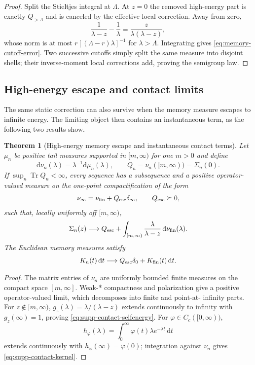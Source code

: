 \documentclass[11pt]{article}
\newtheorem{theorem}{Theorem}[section]
\theoremstyle{definition}
\theoremstyle{remark}
\theoremstyle{definition}
\theoremstyle{remark}
\newcommand{\dd}{\mathrm d}
\newcommand{\Tr}{\operatorname{Tr}}
\begin{document}
\begin{proof}
Split the Stieltjes integral at $\Lambda$.  At $z=0$ the removed high-energy part is
exactly $Q_{>\Lambda}$ and is canceled by the effective local correction.  Away from zero,
\[
\frac1{\lambda-z}-\frac1\lambda
=\frac z{\lambda(\lambda-z)},
\]
whose norm is at most
$r[(\Lambda-r)\lambda]^{-1}$ for $\lambda>\Lambda$.  Integrating gives
\eqref{eq:memory-cutoff-error}.  Two successive cutoffs simply split the same
measure into disjoint shells; their inverse-moment local corrections add, proving the
semigroup law.
\end{proof}

\subsection{High-energy escape and contact limits}

The same static correction can also survive when the memory measure escapes
to infinite energy.  The limiting object then contains an instantaneous
term, as the following two results show.

\begin{theorem}[High-energy memory escape and instantaneous contact terms]
\label{thm:supp-contact-escape}
Let $\mu_n$ be positive tail measures supported in $[m,\infty)$ for one
$m>0$ and define
\[
 \dd\nu_n(\lambda)=\lambda^{-1}\dd\mu_n(\lambda),
 \qquad
 Q_n=\nu_n([m,\infty))=\Sigma_n(0).
\]
If $\sup_n\Tr Q_n<\infty$, every sequence has a subsequence and a positive
operator-valued measure on the one-point compactification of the form
\[
 \nu_\infty=\nu_{\rm fin}+Q_{\rm esc}\delta_\infty,
 \qquad Q_{\rm esc}\succeq0,
\]
such that, locally uniformly off $[m,\infty)$,
\begin{equation}
 {
 \Sigma_n(z)\longrightarrow
 Q_{\rm esc}
 +\int_{[m,\infty)}
  \frac{\lambda}{\lambda-z}\,\dd\nu_{\rm fin}(\lambda).}
 \label{eq:supp-contact-selfenergy}
\end{equation}
The Euclidean memory measures satisfy
\begin{equation}
 {
 K_n(t)\,\dd t
 \longrightarrow
 Q_{\rm esc}\delta_0+K_{\rm fin}(t)\,\dd t.}
 \label{eq:supp-contact-kernel}
\end{equation}
\end{theorem}

\begin{proof}
The matrix entries of $\nu_n$ are uniformly bounded finite measures on the
compact space $[m,\infty]$.  Weak-* compactness and polarization give a
positive operator-valued limit, which decomposes into finite and point-at-
infinity parts.  For $z\notin[m,\infty)$,
$g_z(\lambda)=\lambda/(\lambda-z)$ extends continuously to infinity with
$g_z(\infty)=1$, proving \eqref{eq:supp-contact-selfenergy}.
For $\varphi\in C_c([0,\infty))$,
\[
 h_\varphi(\lambda)
 =\int_0^\infty\varphi(t)\lambda e^{-\lambda t}\,\dd t
\]
extends continuously with $h_\varphi(\infty)=\varphi(0)$; integration against
$\nu_n$ gives \eqref{eq:supp-contact-kernel}.
\end{proof}
\end{document}
